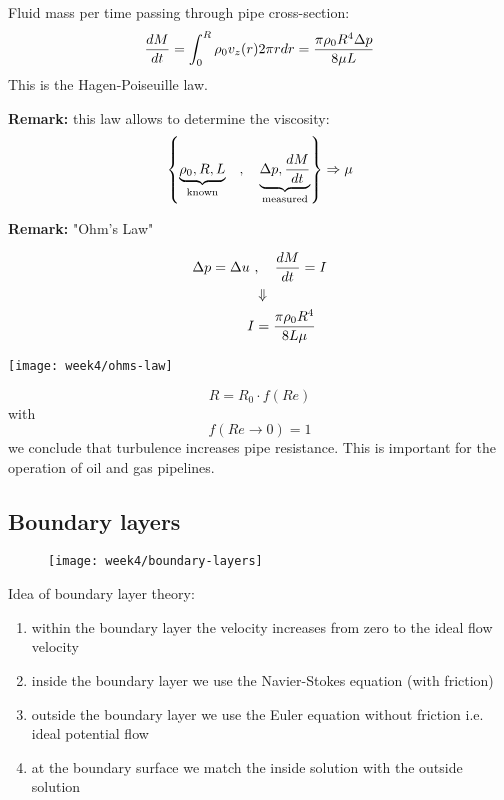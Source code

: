 Fluid mass per time passing through pipe cross-section:
\begin{equation}
\frac{d M}{d t} = \int_0^R\rho_0 v_z(r)2\pi r dr = \frac{\pi\rho_0 R^4\Delta p}{8\mu L}
\end{equation}
This is the Hagen-Poiseuille law.
\begin{framed}
\textbf{Remark:} this law allows to determine the viscosity:
\begin{equation}
\left\lbrace \underbrace{\rho_0,R,L}_\mathrm{known} \quad,\quad \underbrace{\Delta p,\frac{d M}{d t}}_\mathrm{measured} \right\rbrace \Rightarrow \mu
\end{equation}
\end{framed}

\begin{framed}
\textbf{Remark:} "Ohm's Law"

\begin{align}
\Delta p = \Delta u \ &,\quad \frac{d M}{d t} = I\\
&\Downarrow\notag\\
I &= \frac{\pi\rho_0 R^4}{8L\mu}
\end{align}

{\center
\texttt{[image: week4/ohms-law]}\\
}

\begin{equation}
R = R_0\cdot f(Re)
\end{equation}
with
\begin{equation}
f(Re\rightarrow0)=1
\end{equation}
we conclude that turbulence increases pipe resistance. This is important for the operation of oil and gas pipelines.
\end{framed}




\newpage
\subsection{Boundary layers}

\begin{figure}[ht]
    \centering
    \texttt{[image: week4/boundary-layers]}\\
    \caption{}
    \label{fig:boundary-layers}
\end{figure}

Idea of boundary layer theory:
\begin{enumerate}
\item within the boundary layer the velocity increases from zero to the ideal flow velocity
\item inside the boundary layer we use the Navier-Stokes equation (with friction)
\item outside the boundary layer we use the Euler equation without friction i.e. ideal potential flow
\item at the boundary surface we match the inside solution with the outside solution
\end{enumerate}

